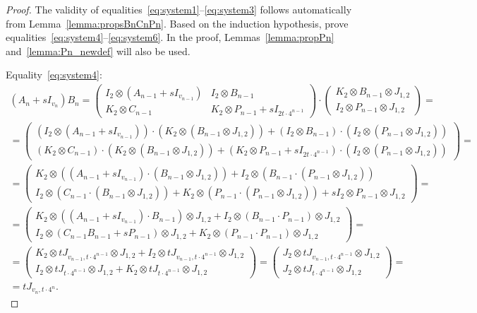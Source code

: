 \documentclass[10pt,a4paper]{amsart}
\begin{document}
\begin{proof}
The validity of equalities~\eqref{eq:system1}--\eqref{eq:system3} follows automatically from Lemma~\ref{lemma:propsBnCnPn}. Based on the induction hypothesis, prove equalities~\eqref{eq:system4}--\eqref{eq:system6}. In the proof, Lemmas~\ref{lemma:propPn} and~\ref{lemma:Pn_newdef} will also be used.

Equality~\eqref{eq:system4}:
\begin{multline}
(A_n + s I_{v_n})B_n = \left(
\begin{array}{c|c}
I_2 \otimes (A_{n-1} + sI_{v_{n-1}}) & I_2 \otimes B_{n-1} \\ \hline
K_2 \otimes C_{n-1} & K_2 \otimes P_{n-1} + sI_{2t\cdot 4^{n-1}}
\end{array}	
\right)\cdot
\left(
\begin{array}{c}
K_2 \otimes B_{n-1} \otimes J_{1, 2} \\ \hline
I_2 \otimes P_{n-1} \otimes J_{1, 2}
\end{array}
\right)=
\\
=\left(
\begin{array}{c}
(I_2 \otimes (A_{n-1} + sI_{v_{n-1}}))\cdot (K_2 \otimes (B_{n-1} \otimes J_{1, 2})) + (I_2 \otimes B_{n-1})\cdot (I_2 \otimes (P_{n-1} \otimes J_{1, 2})) \\ \hline
(K_2 \otimes C_{n-1})\cdot (K_2 \otimes (B_{n-1} \otimes J_{1, 2})) + (K_2 \otimes P_{n-1} + sI_{2t\cdot 4^{n-1}})\cdot (I_2 \otimes (P_{n-1} \otimes J_{1, 2}))
\end{array}
\right)=
\\
=\left(
\begin{array}{c}
K_2\otimes ((A_{n-1} + sI_{v_{n-1}})\cdot (B_{n-1}\otimes J_{1, 2})) + I_2\otimes (B_{n-1}\cdot (P_{n-1}\otimes J_{1, 2})) \\ \hline
I_2\otimes (C_{n-1}\cdot (B_{n-1}\otimes J_{1,2})) + K_2\otimes (P_{n-1}\cdot (P_{n-1}\otimes J_{1, 2})) + sI_2\otimes P_{n-1}\otimes J_{1, 2} 
\end{array}
\right)=
\\
=\left(
\begin{array}{c}
K_2\otimes ((A_{n-1} + sI_{v_{n-1}})\cdot B_{n-1}) \otimes J_{1, 2} + I_2 \otimes (B_{n-1}\cdot P_{n-1}) \otimes J_{1, 2}\\ \hline
I_2\otimes(C_{n-1}B_{n-1}+sP_{n-1})\otimes J_{1, 2} + K_2\otimes (P_{n-1}\cdot P_{n-1})\otimes J_{1, 2}
\end{array}
\right)=
\\
=\left(
\begin{array}{c}
K_2\otimes tJ_{v_{n-1}, t\cdot 4^{n-1}} \otimes J_{1, 2} + I_2 \otimes tJ_{v_{n-1}, t\cdot 4^{n-1}} \otimes J_{1, 2}\\ \hline
I_2\otimes tJ_{t\cdot 4^{n-1}} \otimes J_{1, 2} + K_2\otimes tJ_{t\cdot 4^{n-1}} \otimes J_{1, 2}
\end{array}
\right)=
\left(
\begin{array}{c}
J_2\otimes tJ_{v_{n-1}, t\cdot 4^{n-1}} \otimes J_{1, 2}\\ \hline
J_2\otimes tJ_{t\cdot 4^{n-1}} \otimes J_{1, 2}
\end{array}
\right) =\\= tJ_{v_n, t\cdot{4^n}}.
\end{multline}


\end{proof}
\end{document}
